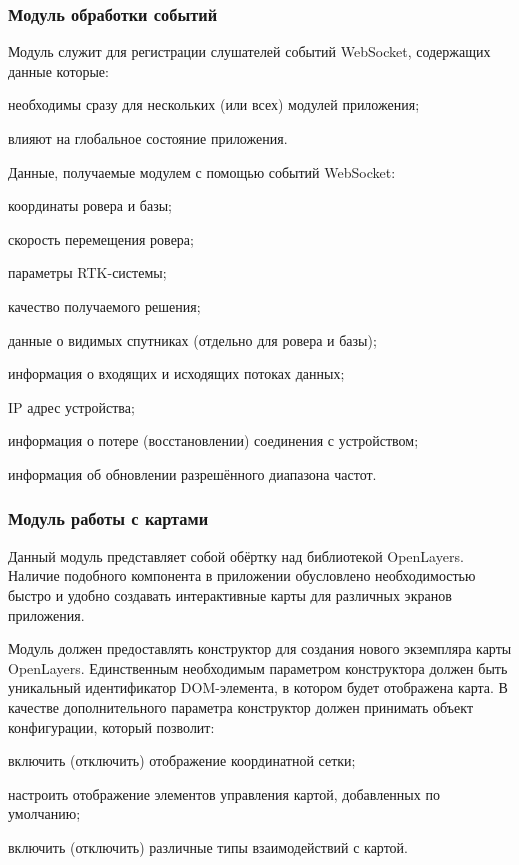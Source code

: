 \subsubsection{Модуль обработки событий}

Модуль служит для регистрации слушателей событий WebSocket, содержащих данные которые:
\begin{dashitemize}
  \item необходимы сразу для нескольких (или всех) модулей приложения;
  \item влияют на глобальное состояние приложения.
\end{dashitemize}

Данные, получаемые модулем с помощью событий WebSocket:
\begin{dashitemize}
  \item координаты ровера и базы;
  \item скорость перемещения ровера;
  \item параметры RTK-системы;
  \item качество получаемого решения;
  \item данные о видимых спутниках (отдельно для ровера и базы);
  \item информация о входящих и исходящих потоках данных;
  \item IP адрес устройства;
  \item информация о потере (восстановлении) соединения с устройством;
  \item информация об обновлении разрешённого диапазона частот.
\end{dashitemize}


\subsubsection{Модуль работы с картами}

Данный модуль представляет собой обёртку над библиотекой OpenLayers. Наличие подобного компонента в приложении обусловлено необходимостью быстро и удобно создавать интерактивные карты для различных экранов приложения.

Модуль должен предоставлять конструктор для создания нового экземпляра карты OpenLayers. Единственным необходимым параметром конструктора должен быть уникальный идентификатор DOM-элемента, в котором будет отображена карта. В качестве дополнительного параметра конструктор должен принимать объект конфигурации, который позволит:
\begin{dashitemize}
  \item включить (отключить) отображение координатной сетки;
  \item настроить отображение элементов управления картой, добавленных по умолчанию;
  \item включить (отключить) различные типы взаимодействий с картой.
\end{dashitemize}


